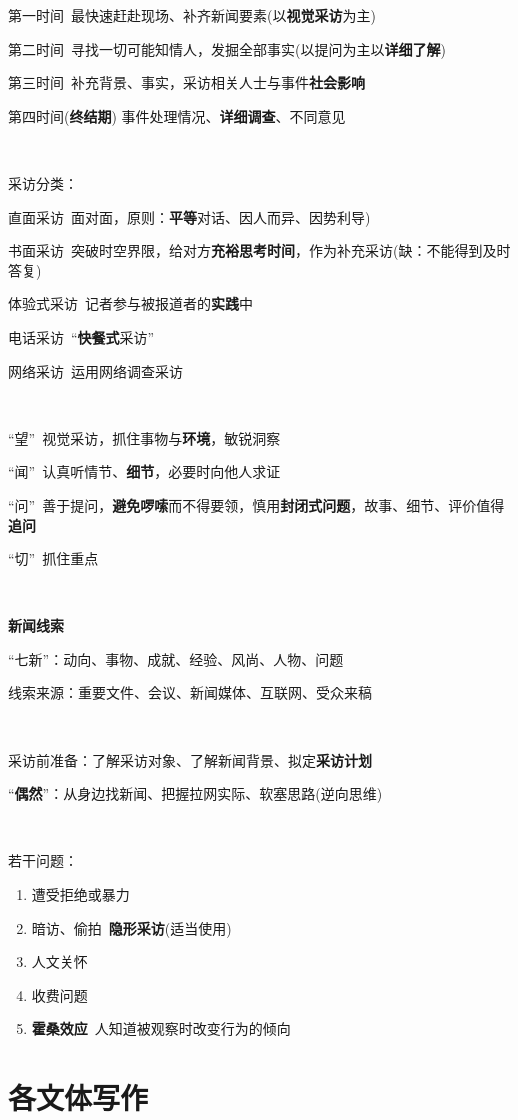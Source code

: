 \documentclass[a4paper,UTF8]{ctexart}
\begin{document}
第一时间\ 最快速赶赴现场、补齐新闻要素(以\textbf{视觉采访}为主)

第二时间\ 寻找一切可能知情人，发掘全部事实(以提问为主以\textbf{详细了解})

第三时间\ 补充背景、事实，采访相关人士与事件\textbf{社会影响}

第四时间(\textbf{终结期}) 事件处理情况、\textbf{详细调查}、不同意见

~

采访分类：

直面采访\ 面对面，原则：\textbf{平等}对话、因人而异、因势利导)

书面采访\ 突破时空界限，给对方\textbf{充裕思考时间}，作为补充采访(缺：不能得到及时答复)

体验式采访\ 记者参与被报道者的\textbf{实践}中

电话采访\ “\textbf{快餐式}采访”

网络采访\ 运用网络调查采访

~

“望”\ 视觉采访，抓住事物与\textbf{环境}，敏锐洞察

“闻”\ 认真听情节、\textbf{细节}，必要时向他人求证

“问”\ 善于提问，\textbf{避免啰嗦}而不得要领，慎用\textbf{封闭式问题}，故事、细节、评价值得\textbf{追问}

“切”\ 抓住重点

~

\textbf{新闻线索}

“七新”：动向、事物、成就、经验、风尚、人物、问题

线索来源：重要文件、会议、新闻媒体、互联网、受众来稿

~

采访前准备：了解采访对象、了解新闻背景、拟定\textbf{采访计划}

“\textbf{偶然}”：从身边找新闻、把握拉网实际、软塞思路(逆向思维)

~

若干问题：
\begin{enumerate}
	\item 遭受拒绝或暴力
	\item 暗访、偷拍\ \textbf{隐形采访}(适当使用)
	\item 人文关怀
	\item 收费问题
	\item \textbf{霍桑效应}\ 人知道被观察时改变行为的倾向
\end{enumerate}

\section{各文体写作}
\end{document}
